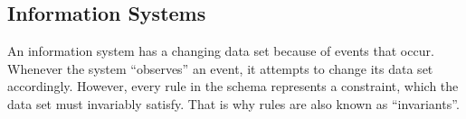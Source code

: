 \documentclass{elsarticle}
\begin{document}
   




\subsection{Information Systems}
\label{sct:Information Systems}
   An information system has a changing data set because of events that occur.
   Whenever the system ``observes'' an event, it attempts to change its data set accordingly.
   However, every rule in the schema represents a constraint,
   which the data set must invariably satisfy.
   That is why rules are also known as ``invariants''.
\end{document}
